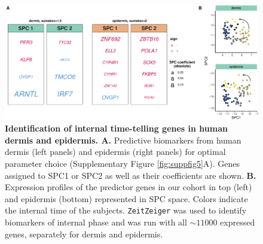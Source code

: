 \begin{figure}[t!]
	\begin{center}
		\includegraphics[width=\textwidth]{./Figures/fig3.pdf}
		\caption{\textbf{Identification of internal time-telling genes in human dermis and epidermis. A. }Predictive biomarkers from human dermis (left panels) and epidermis (right panels) for optimal parameter choice (Supplementary Figure \ref{fig:suppfig5}A). Genes assigned to SPC1 or SPC2 as well as their coefficients are shown. \textbf{B. }Expression profiles of the predictor genes in our cohort in top (left) and epidermis (bottom) represented in SPC space. Colors indicate the internal time of the subjects. \texttt{ZeitZeiger} was used to identify biomarkers of internal phase and was run with all $\sim11000$ expressed genes, separately for dermis and epidermis.
		}
		\label{fig:fig3}
	\end{center}
\end{figure}


